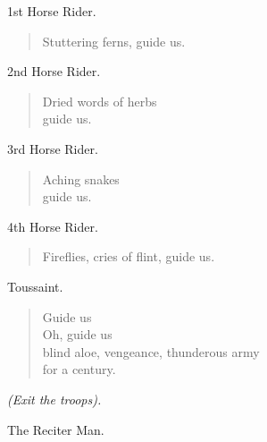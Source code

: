 \documentclass[letterpaper,article,12pt,oneside,notitlepage]{memoir}
\begin{document}
\begin{center}1st Horse Rider.\end{center}

\begin{verse}
\hspace{1cm} Stuttering ferns, guide us. \\
\end{verse}

\begin{center}2nd Horse Rider.\end{center}

\begin{verse}
Dried words of herbs \\
guide us. \\
\end{verse}

\begin{center}3rd Horse Rider.\end{center}

\begin{verse}
Aching snakes \\
guide us. \\
\end{verse}

\begin{center}4th Horse Rider.\end{center}

\begin{verse}
Fireflies, cries of flint, guide us. \\
\end{verse}

\clearpage

\begin{center}Toussaint.\end{center}

\begin{verse}
Guide us \\
Oh, guide us \\
blind aloe, vengeance, thunderous army \\
for a century. \\
\end{verse}

\textit{(Exit the troops).}

\begin{center}The Reciter Man.\end{center}
\end{document}
